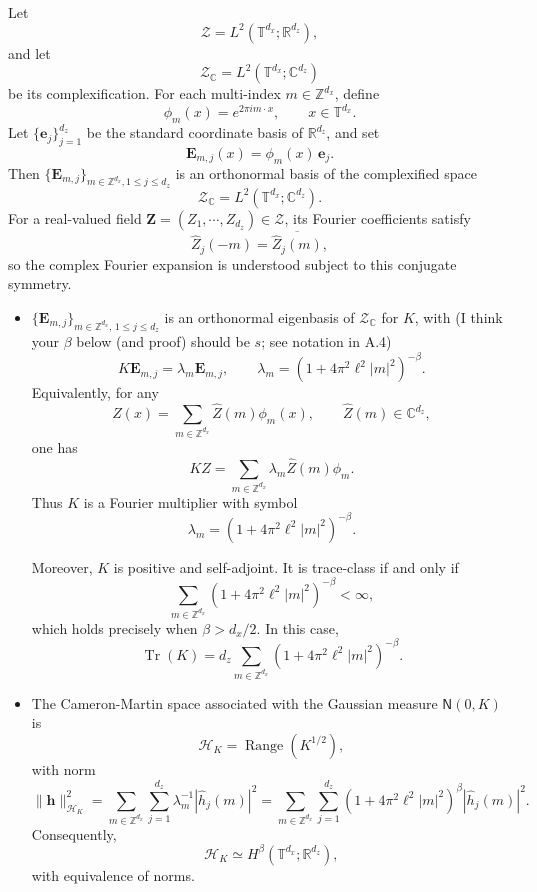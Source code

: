 \documentclass[11pt]{article}
\newcommand{\jg}[1]{{\color{red}#1}}
\begin{document}
\begin{corollary}
\label{cor:laplacian_resolvent_spectral_geometry}
Let
\[
    \mathcal Z=L^2(\mathbb T^{d_x};\mathbb R^{d_z}),
\]
and let
\[
    \mathcal Z_{\mathbb C}
    =
    L^2(\mathbb T^{d_x};\mathbb C^{d_z})
\]
be its complexification. For each multi-index $m\in\mathbb Z^{d_x}$, define
\[
    \phi_m(x)=e^{2\pi i m\cdot x},
    \qquad x\in\mathbb T^{d_x}.
\]
Let $\{\mathbf e_j\}_{j=1}^{d_z}$ be the standard coordinate basis of $\mathbb R^{d_z}$, and set
\[
    \mathbf E_{m,j}(x)=\phi_m(x)\,\mathbf e_j.
\]
Then $\{\mathbf E_{m,j}\}_{m\in\mathbb Z^{d_x},1\le j\le d_z}$ is an orthonormal basis of the complexified space
\[
    \mathcal Z_{\mathbb C}
    =
    L^2(\mathbb T^{d_x};\mathbb C^{d_z}).
\]
For a real-valued field $\mathbf{Z}=(Z_1,\cdots,Z_{d_z})\in\mathcal Z$, its Fourier coefficients satisfy
\[
    \widehat Z_j(-m)=\overline{\widehat Z_j(m)},
\]
so the complex Fourier expansion is understood subject to this conjugate symmetry.

\begin{itemize}
\item[(a)]$\{\mathbf E_{m,j}\}_{m\in\mathbb Z^{d_x},\,1\le j\le d_z}$ is an orthonormal eigenbasis of $\mathcal Z_\mathbb{C}$ for $K$, with \jg{(I think your $\beta$ below (and proof) should be $s$; see notation in A.4)}
\[ K \mathbf E_{m,j} = \lambda_m \mathbf E_{m,j}, \qquad \lambda_m = \left(1+4\pi^2\ell^2|m|^2\right)^{-\beta}. \]
Equivalently, for any
\[
    Z(x)=\sum_{m\in\mathbb Z^{d_x}}\widehat Z(m)\phi_m(x),
    \qquad 
    \widehat Z(m)\in\mathbb C^{d_z},
\]
one has
\[
    KZ
    =
    \sum_{m\in\mathbb Z^{d_x}}
    \lambda_m \widehat Z(m)\phi_m.
\]
Thus $K$ is a Fourier multiplier with symbol
\[
    \lambda_m=\left(1+4\pi^2\ell^2|m|^2\right)^{-\beta}.
\]

Moreover, $K$ is positive and self-adjoint. It is trace-class if and only if
\[
    \sum_{m\in\mathbb Z^{d_x}}
    \left(1+4\pi^2\ell^2|m|^2\right)^{-\beta}
    <\infty,
\]
which holds precisely when $\beta>d_x/2$.
In this case,
\[
    \operatorname{Tr}(K)
    =
    d_z
    \sum_{m\in\mathbb Z^{d_x}}
    \left(1+4\pi^2\ell^2|m|^2\right)^{-\beta}.
\]

\item[(b)] The Cameron-Martin space associated with the Gaussian measure $\mathsf N(0,K)$ is
\[
    \mathcal H_K
    =
    \operatorname{Range}(K^{1/2}),
\]
with norm
\[
    \|\mathbf{h}\|_{\mathcal H_K}^2
    =
    \sum_{m\in\mathbb Z^{d_x}}
    \sum_{j=1}^{d_z}
    \lambda_m^{-1}
    |\widehat h_j(m)|^2=
    \sum_{m\in\mathbb Z^{d_x}}
    \sum_{j=1}^{d_z}
    \left(1+4\pi^2\ell^2|m|^2\right)^\beta
    |\widehat h_j(m)|^2.
\]
Consequently,
\[
    \mathcal H_K
    \simeq H^\beta(\mathbb T^{d_x};\mathbb R^{d_z}),
\]
with equivalence of norms.
\end{itemize}
\end{corollary}
\end{document}
